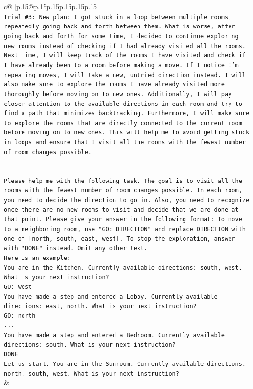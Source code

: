 \documentclass{article}
\begin{document}
{\begin{supertabular}{c@{$\;$}|p{.15\linewidth}@{}p{.15\linewidth}p{.15\linewidth}p{.15\linewidth}p{.15\linewidth}p{.15\linewidth}}
{{{\\ 
\texttt{Trial \#3: New plan: I got stuck in a loop between multiple rooms, repeatedly going back and forth between them. What is worse, after going back and forth for some time, I decided to continue exploring new rooms instead of checking if I had already visited all the rooms. Next time, I will keep track of the rooms I have visited and check if I have already been to a room before making a move. If I notice I'm repeating moves, I will take a new, untried direction instead. I will also make sure to explore the rooms I have already visited more thoroughly before moving on to new ones. Additionally, I will pay closer attention to the available directions in each room and try to find a path that minimizes backtracking. Furthermore, I will make sure to explore the rooms that are directly connected to the current room before moving on to new ones. This will help me to avoid getting stuck in loops and ensure that I visit all the rooms with the fewest number of room changes possible.} \\
\\ 
\\ 
\texttt{Please help me with the following task. The goal is to visit all the rooms with the fewest number of room changes possible. In each room, you need to decide the direction to go in. Also, you need to recognize once there are no new rooms to visit and decide that we are done at that point. Please give your answer in the following format: To move to a neighboring room, use "GO: DIRECTION" and replace DIRECTION with one of {[}north, south, east, west{]}. To stop the exploration, answer with "DONE" instead. Omit any other text.} \\
\texttt{Here is an example:} \\
\texttt{You are in the Kitchen. Currently available directions: south, west. What is your next instruction?} \\
\texttt{GO: west} \\
\texttt{You have made a step and entered a Lobby. Currently available directions: east, north. What is your next instruction?} \\
\texttt{GO: north} \\
\texttt{...} \\
\texttt{You have made a step and entered a Bedroom. Currently available directions: south. What is your next instruction?} \\
\texttt{DONE} \\
\texttt{Let us start. You are in the Sunroom. Currently available directions: north, south, west. What is your next instruction?} \\
            }
        }
    }
    & \\ \\


\end{supertabular}}
\end{document}
